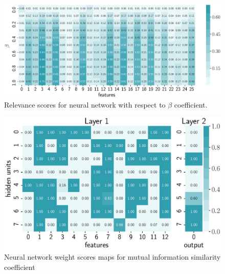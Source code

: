 \documentclass[a4paper,12pt]{article}
\theoremstyle{plain} %
\theoremstyle{definition} %
\theoremstyle{remark} %
\begin{document}
	\begin{figure}[!h]	
		\centering
		\includegraphics[width=\linewidth]{figs/neural_b_wrt_beta.eps}	 
		\caption{Relevance scores for neural network with respect to $\beta$ coefficient.}
		\label{fig:neural_b_wrt_beta}
	\end{figure}

	\begin{figure}[!h]	
		\centering
		\includegraphics[width=0.8\linewidth]{figs/qpfs_nn_weight_maps.eps}	 
		\caption{Neural network weight scores maps for mutual information similarity coefficient}
		\label{fig:qpfs_nn_weight_maps}
	\end{figure}
				
   \newpage
   \hrulefill
  
	
\end{document}
